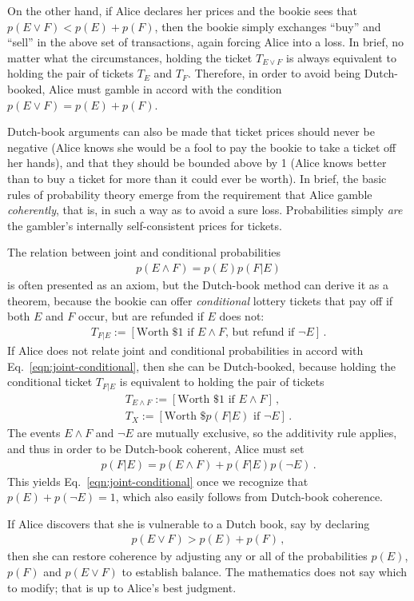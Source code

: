 \documentclass[%
 reprint,superscriptaddress,
 amsmath,amssymb,
 aps,twocolumn,pra
]{revtex4-1}
\newcommand{\eqn}[1]{\begin{eqnarray} #1 \end{eqnarray}}
\newcommand{\tit}[1]{\textit{#1}}
\newcommand{\trm}[1]{\textrm{#1}}
\begin{document}
On the other hand, if Alice declares her prices and the bookie sees that $p(E \lor F) < p(E) + p(F)$, then the bookie simply exchanges ``buy'' and ``sell'' in the above set of transactions, again forcing Alice into a loss. In brief, no matter what the circumstances, holding the ticket $T_{E\lor F}$ is always equivalent to holding the pair of tickets $T_E$ and $T_F$. Therefore, in order to avoid being Dutch-booked, Alice must gamble in accord with the condition $p(E \lor F) = p(E) + p(F)$.

Dutch-book arguments can also be made that ticket prices should never be negative (Alice knows she would be a fool to pay the bookie to take a ticket off her hands), and that they should be bounded above by 1 (Alice knows better than to buy a ticket for more than it could ever be worth). In brief, the basic rules of probability theory emerge from the requirement that Alice gamble \tit{coherently}, that is, in such a way as to avoid a sure loss. Probabilities simply \tit{are} the gambler's internally self-consistent prices for tickets.

The relation between joint and conditional probabilities
\eqn{
  p(E \land F) = p(E)p(F|E)
  \label{eqn:joint-conditional}
}
is often presented as an axiom, but the Dutch-book method can derive it as a theorem, because the bookie can offer \tit{conditional} lottery tickets that pay off if both $E$ and $F$ occur, but are refunded if $E$ does not:
\eqn{
  T_{F|E} := [ \trm{Worth \$1 if $E \land F$, but refund if $\neg E$} ] \, .
}
If Alice does not relate joint and conditional probabilities in accord with Eq.\ \eqref{eqn:joint-conditional}, then she can be Dutch-booked, because holding the conditional ticket $T_{F|E}$ is equivalent to holding the pair of tickets
\eqn{
  T_{E \land F} := [\trm{Worth \$1 if $E \land F$}] \, , \nonumber\\
  T_{X} := [\trm{Worth \$$p(F|E)$ if $\neg E$}] \, .
}
The events $E \land F$ and $\neg E$ are mutually exclusive, so the additivity rule applies, and thus in order to be Dutch-book coherent, Alice must set
\eqn{
  p(F|E) = p(E \land F) + p(F|E)p(\neg E) \, .
}
This yields Eq.\ \eqref{eqn:joint-conditional} once we recognize that $p(E) + p(\neg E) = 1$, which also easily follows from Dutch-book coherence.

If Alice discovers that she is vulnerable to a Dutch book, say by declaring
\eqn{
  p(E \lor F) > p(E) + p(F) \, ,
}
then she can restore coherence by adjusting any or all of the probabilities $p(E)$, $p(F)$ and $p(E \lor F)$ to establish balance. The mathematics does not say which to modify; that is up to Alice's best judgment.
\end{document}
